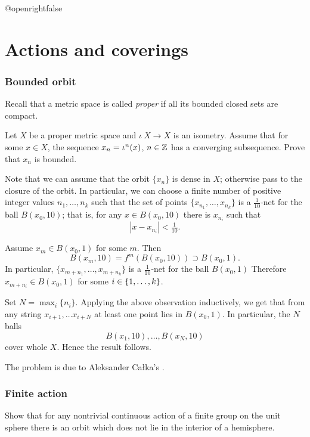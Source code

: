 \csname @openrightfalse\endcsname
\chapter{Actions and coverings}

\subsection*{Bounded orbit}
\label{Bounded orbit}

Recall that a metric space is called \emph{proper} if all its bounded closed sets are compact.

\begin{pr} Let $X$ be a 
proper metric space 
and $\iota\:X\to X$ is an isometry.
Assume that for some $x\in X$, the sequence $x_n\z=\iota^n(x)$, $n\in\mathbb{Z}$ has a converging subsequence.
Prove that $x_n$ is bounded.
\end{pr}

Note that we can assume that the orbit $\{x_n\}$ is dense in $X$;
otherwise pass to the closure of the orbit.
In particular, we can choose a finite number of positive integer values $n_1,\dots,n_k$
such that the set of points $\{x_{n_1},\dots,x_{n_k}\}$ is a $\tfrac1{10}$-net for the ball $B(x_0,10)$;
that is, for any $x\in B(x_0,10)$ there is $x_{n_i}$ such that
\[|x-x_{n_i}|<\tfrac1{10}.\]

Assume $x_m\in B(x_0,1)$ for some $m$.
Then 
\[B(x_m,10)=f^m( B(x_0,10))\supset B(x_0,1).\] 
In particular, $\{x_{m+n_1},\dots,x_{m+n_k}\}$ is a $\tfrac1{10}$-net for the ball $B(x_0,1)$
Therefore $x_{m+n_i}\in B(x_0,1)$ for some $i\z\in\{1,\dots,k\}$.

Set $N=\max_i\{n_i\}$.
Applying the above observation inductively, we get that from any string $x_{i+1},\dots x_{i+N}$
at least one point lies in $B(x_0,1)$.
In particular, the $N$ balls
\[B(x_1,10),\dots,B(x_N,10)\]
cover whole $X$.
Hence the result follows.\qeds

The problem is due to Aleksander Ca{\l}ka's \cite[see][]{calka}.

\subsection*{Finite action}\label{Finite action}

\begin{pr}
Show that for any nontrivial continuous action of a finite group on the unit sphere
there is an orbit which does not lie in the interior of a hemisphere.
\end{pr}


